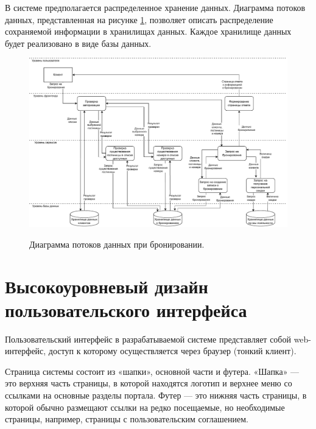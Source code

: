 \pagebreak

В системе предполагается распределенное хранение данных. Диаграмма потоков данных, представленная на рисунке \ref{fig:data_flow}, позволяет описать распределение сохраняемой информации в хранилищах данных. Каждое хранилище данных будет реализовано в виде базы данных.

\begin{figure}[h!]
	\begin{center}
		{\includegraphics[angle = 90, scale = 0.725]{img/flow/data_flow.pdf}}
		\caption{Диаграмма потоков данных при бронировании.}
		\label{fig:data_flow}
	\end{center}
\end{figure} 

\pagebreak

\section*{Высокоуровневый дизайн пользовательского интерфейса}
Пользовательский интерфейс в разрабатываемой системе представляет собой web-интерфейс, доступ к которому осуществляется через браузер (тонкий клиент).

Страница системы состоит из «шапки», основной части и футера.  «Шапка» —  это  верхняя  часть  страницы,  в  которой находятся логотип и верхнее меню со ссылками на основные разделы портала. Футер — это нижняя часть страницы, в которой обычно размещают ссылки  на  редко  посещаемые,  но  необходимые  страницы,  например, страницы с пользовательским соглашением.

